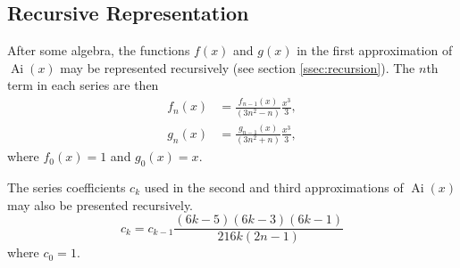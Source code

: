 \documentclass[]{article}
\newcommand{\Ai}[1]{\ensuremath{\operatorname{Ai}({#1})}}
\begin{document}
\subsection{Recursive Representation}\label{app:recursion}

After some algebra, the functions $f(x)$ and $g(x)$ in the first approximation of $\Ai{x}$ may be represented recursively (see section \ref{ssec:recursion}). The $n$th term in each series are then
\begin{align*}
f_{n}(x) &= \frac{f_{n-1}(x)}{(3n^{2} - n)} \frac{x^{3}}{3},\\ 
g_{n}(x) &= \frac{g_{n-1}(x)}{(3n^{2} + n)} \frac{x^{3}}{3},
\end{align*}
where $f_{0}(x) = 1$ and $g_{0}(x) = x$.

The series coefficients $c_{k}$ used in the second and third approximations of $\Ai{x}$ may also be presented recursively.
\[
c_{k} = c_{k-1} \frac{(6k-5)(6k-3)(6k-1)}{216k(2n-1)}
\]
where $c_{0} = 1$.



\end{document}

